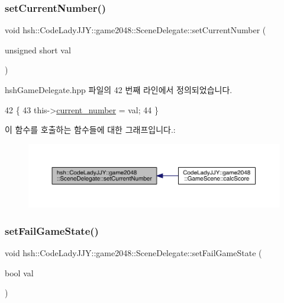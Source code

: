 \subsubsection{\texorpdfstring{set\+Current\+Number()}{setCurrentNumber()}}
{\footnotesize\ttfamily void hsh\+::\+Code\+Lady\+J\+J\+Y\+::game2048\+::\+Scene\+Delegate\+::set\+Current\+Number (\begin{DoxyParamCaption}\item[{unsigned short}]{val }\end{DoxyParamCaption})\hspace{0.3cm}{\ttfamily [inline]}}



hsh\+Game\+Delegate.\+hpp 파일의 42 번째 라인에서 정의되었습니다.


\begin{DoxyCode}
42                                                          \{
43                     this->\hyperlink{classhsh_1_1_code_lady_j_j_y_1_1game2048_1_1_scene_delegate_af013ba6abf67944a36a117be7c97f0d3}{current\_number} = val;
44                 \}
\end{DoxyCode}
이 함수를 호출하는 함수들에 대한 그래프입니다.\+:
\nopagebreak
\begin{figure}[H]
\begin{center}
\leavevmode
\includegraphics[width=350pt]{d7/d4d/classhsh_1_1_code_lady_j_j_y_1_1game2048_1_1_scene_delegate_a5a18f6b50e0a4d8b4a92b13e1fb3fd85_icgraph}
\end{center}
\end{figure}
\mbox{\label{classhsh_1_1_code_lady_j_j_y_1_1game2048_1_1_scene_delegate_adc205b068a4df3da173c37d4236a4e25}} 
\subsubsection{\texorpdfstring{set\+Fail\+Game\+State()}{setFailGameState()}}
{\footnotesize\ttfamily void hsh\+::\+Code\+Lady\+J\+J\+Y\+::game2048\+::\+Scene\+Delegate\+::set\+Fail\+Game\+State (\begin{DoxyParamCaption}\item[{bool}]{val }\end{DoxyParamCaption})\hspace{0.3cm}{\ttfamily [inline]}}



